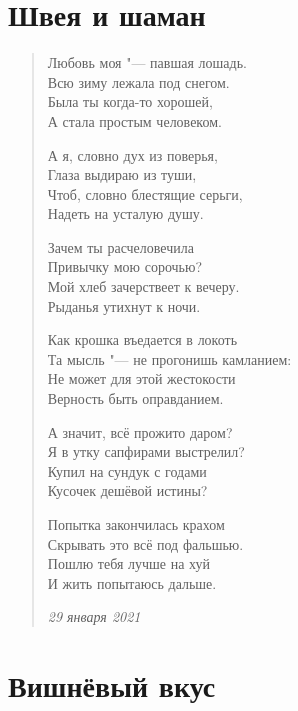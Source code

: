 \documentclass[a4paper,12pt]{article}
\begin{document}
\section{Швея и шаман}

\begin{verse}
Любовь моя "--- павшая лошадь. \\
Всю зиму лежала под снегом. \\
Была ты когда-то хорошей, \\
А стала простым человеком.

А я, словно дух из поверья, \\
Глаза выдираю из туши, \\
Чтоб, словно блестящие серьги, \\
Надеть на усталую душу. 

Зачем ты расчеловечила \\
Привычку мою сорочью? \\
Мой хлеб зачерствеет к вечеру. \\
Рыданья утихнут к ночи. 

Как крошка въедается в локоть \\
Та мысль "--- не прогонишь камланием: \\
Не может для этой жестокости \\
Верность быть оправданием. 

А значит, всё прожито даром? \\
Я в утку сапфирами выстрелил? \\
Купил на сундук с годами \\
Кусочек дешёвой истины? 

Попытка закончилась крахом \\
Скрывать это всё под фальшью. \\
Пошлю тебя лучше на хуй \\
И жить попытаюсь дальше. 

\emph{29 января 2021}
\end{verse}
\newpage

\section{Вишнёвый вкус}
\end{document}
